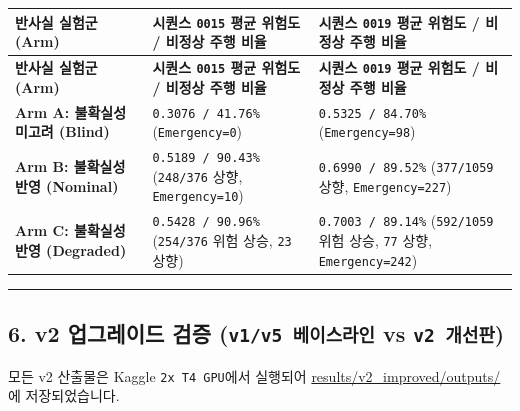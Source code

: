 \documentclass[10.5pt,a4paper]{article}
\begin{document}
\begin{footnotesize}
\setlength{\tabcolsep}{4pt}
\setlength{\LTleft}{0pt}\setlength{\LTright}{0pt}
\begin{longtable}{>{\raggedright\arraybackslash}p{} >{\raggedright\arraybackslash}p{} >{\raggedright\arraybackslash}p{}}
\toprule
\textbf{반사실 실험군 (Arm)} & \textbf{시퀀스 \texttt{0015} 평균 위험도 / 비정상 주행 비율} & \textbf{시퀀스 \texttt{0019} 평균 위험도 / 비정상 주행 비율} \\
\midrule
\endfirsthead
\toprule
\textbf{반사실 실험군 (Arm)} & \textbf{시퀀스 \texttt{0015} 평균 위험도 / 비정상 주행 비율} & \textbf{시퀀스 \texttt{0019} 평균 위험도 / 비정상 주행 비율} \\
\midrule
\endhead
\bottomrule
\endfoot
\textbf{Arm A: 불확실성 미고려 (Blind)} & \texttt{0.\allowbreak{}3076 /\allowbreak{} 41.\allowbreak{}76\%} (\texttt{Emergency=0}) & \texttt{0.\allowbreak{}5325 /\allowbreak{} 84.\allowbreak{}70\%} (\texttt{Emergency=98}) \\
\textbf{Arm B: 불확실성 반영 (Nominal)} & \texttt{0.\allowbreak{}5189 /\allowbreak{} 90.\allowbreak{}43\%} (\texttt{248/\allowbreak{}376} 상향, \texttt{Emergency=10}) & \texttt{0.\allowbreak{}6990 /\allowbreak{} 89.\allowbreak{}52\%} (\texttt{377/\allowbreak{}1059} 상향, \texttt{Emergency=227}) \\
\textbf{Arm C: 불확실성 반영 (Degraded)} & \texttt{0.\allowbreak{}5428 /\allowbreak{} 90.\allowbreak{}96\%} (\texttt{254/\allowbreak{}376} 위험 상승, \texttt{23} 상향) & \texttt{0.\allowbreak{}7003 /\allowbreak{} 89.\allowbreak{}14\%} (\texttt{592/\allowbreak{}1059} 위험 상승, \texttt{77} 상향, \texttt{Emergency=242}) \\
\end{longtable}
\end{footnotesize}


\par\noindent\rule{\textwidth}{0.4pt}\par\medskip

\subsection{6. v2 업그레이드 검증 (\texttt{v1/\allowbreak{}v5 베이스라인} vs \texttt{v2 개선판})}

모든 v2 산출물은 Kaggle \texttt{2x T4 GPU}에서 실행되어 \href{https://github.com/Heisnotanimposter/Totalcare\_autonomous\_driving\_Yolov5/tree/main/results/v2\_improved/outputs}{results/v2\_improved/outputs/}에 저장되었습니다.
\end{document}
